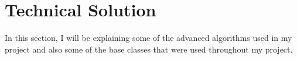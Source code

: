 \chapter{Technical Solution}
In this section, I will be explaining some of the advanced algorithms used in my project and also some of the base classes that were used throughout my project.


